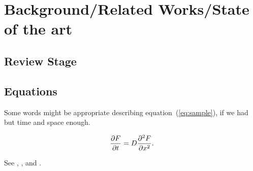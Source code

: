\documentclass{ifacconf}
\begin{document}

\section{Background/Related Works/State of the art}


\subsection{Review Stage}



\subsection{Equations}

Some words might be appropriate describing equation~(\ref{eq:sample}), if 
we had but time and space enough. 

\begin{equation} \label{eq:sample}
{{\partial F}\over {\partial t}} = D{{\partial^2 F}\over {\partial x^2}}.
\end{equation}

See \cite{Abl:56}, \cite{AbTaRu:54}, \cite{Keo:58} and \cite{Pow:85}.

\end{document}
